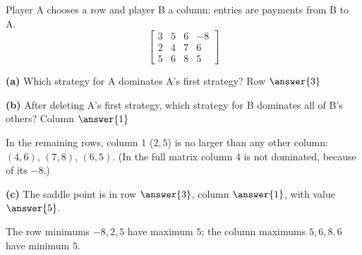 \documentclass[12pt]{ximera}
\begin{document}
\begin{problem}
Player A chooses a row and player B a column; entries are payments from B to A.
\[
\begin{bmatrix} 3 & 5 & 6 & -8\\ 2 & 4 & 7 & 6\\ 5 & 6 & 8 & 5 \end{bmatrix}
\]

\begin{prompt}
\textbf{(a)} Which strategy for A dominates A's first strategy? Row $\answer{3}$
\end{prompt}

\begin{prompt}
\textbf{(b)} After deleting A's first strategy, which strategy for B dominates all of B's
others? Column $\answer{1}$
\begin{feedback}
In the remaining rows, column 1 ($2,5$) is no larger than any other column: $(4,6)$,
$(7,8)$, $(6,5)$. (In the full matrix column 4 is not dominated, because of its $-8$.)
\end{feedback}
\end{prompt}

\begin{prompt}
\textbf{(c)} The saddle point is in row $\answer{3}$, column $\answer{1}$, with value
$\answer{5}$.
\begin{feedback}
The row minimums $-8,2,5$ have maximum $5$; the column maximums $5,6,8,6$ have minimum
$5$.
\end{feedback}
\end{prompt}
\end{problem}
\end{document}
